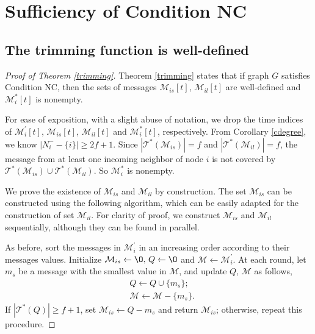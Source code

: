 \documentclass[letterpaper, 11pt]{article}
\newcommand{\calM}{{\mathcal{M}}}
\newcommand{\calT}{{\mathcal{T}}}
\begin{document}
\section{Sufficiency of Condition NC}\label{sec:sufficiencyProof}

\subsection{The trimming function is well-defined}
\label{trimmingProof}
\begin{proof}[Proof of Theorem \ref{trimming}]
Theorem \ref{trimming} states that if graph $G$ satisfies Condition NC, then the sets of messages $\calM_{is}[t]$, $\calM_{il}[t]$ are well-defined and  $\calM_{i}^{*}[t]$ is nonempty.



For ease of exposition, with a slight abuse of notation, we drop the time indices of $\calM_{i}^{\prime}[t]$, $\calM_{is}[t]$, $\calM_{il}[t]$ and $\calM_{i}^{*}[t]$, respectively.
From Corollary \ref{cdegree}, we know $|N_i^--\{i\}|\ge 2f+1$. Since $|\calT^*(\calM_{is})|=f$ and $|\calT^*(\calM_{il})|=f$, the message from at least one incoming neighbor of node $i$ is not covered by $\calT^*(\calM_{is})\cup \calT^*(\calM_{il})$. So $\calM_{i}^{*}$ is nonempty. 


We prove the existence of $\calM_{is}$ and $\calM_{il}$ by construction. The set $\calM_{is}$ can be constructed using the following algorithm, which can be easily adapted for the construction of set $\calM_{il}$. For clarity of proof, we construct $\calM_{is}$ and $\calM_{il}$ sequentially, although they can be found in parallel.

As before, sort the messages in $\calM_i^{\prime}$ in an increasing order according to their messages values. Initialize $\calM_{is}\gets \O, \, Q\gets\O$ and $ \calM \gets \calM_{i}^{\prime}$. At each round, let $m_s$ be a message with the smallest value in $\calM$, and update $Q$, $\calM$ as follows,
\begin{align*}
&Q\gets Q\cup \{m_s\};\\
&\calM\gets \calM-\{m_s\}.
\end{align*}
If $|\calT^*(Q)|\ge f+1$, set $\calM_{is}\gets Q-m_s$ and return $\calM_{is}$; otherwise, repeat this procedure.


\end{proof}
\end{document}
